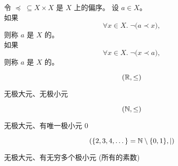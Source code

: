 
\begin{frame}{}
  \begin{definition}
    令 $\preceq \;\subseteq X \times X$ 是 $X$ 上的偏序。
    设 $a \in X$。\\[5pt]

    \pause
    如果
    \[
      \forall x \in X.\; \lnot \big(a \prec x \big),
    \]
    则称 $a$ 是 $X$ 的。\\[10pt]

    \pause
    如果
    \[
      \forall x \in X.\; \lnot \big(x \prec a \big),
    \]
    则称 $a$ 是 $X$ 的。
  \end{definition}

  \pause
  \vspace{0.30cm}
  \begin{center}
  \end{center}
\end{frame}

\begin{frame}{}
  \begin{exampleblock}{}
    \[
      (\mathbb{R}, \le)
    \]
    \pause
    \begin{center}
      无极大元、无极小元
    \end{center}
  \end{exampleblock}

  \pause
  \begin{exampleblock}{}
    \[
      (\mathbb{N}, \le)
    \]
    \pause
    \begin{center}
      无极大元、有唯一极小元 $0$
    \end{center}
  \end{exampleblock}

  \pause
  \begin{exampleblock}{}
    \[
      (\{2, 3, 4, \dots\} = \mathbb{N} \setminus \{0, 1\}, \mid)
    \]
    \pause
    \begin{center}
      无极大元、有无穷多个极小元 (所有的素数)
    \end{center}
  \end{exampleblock}
\end{frame}

